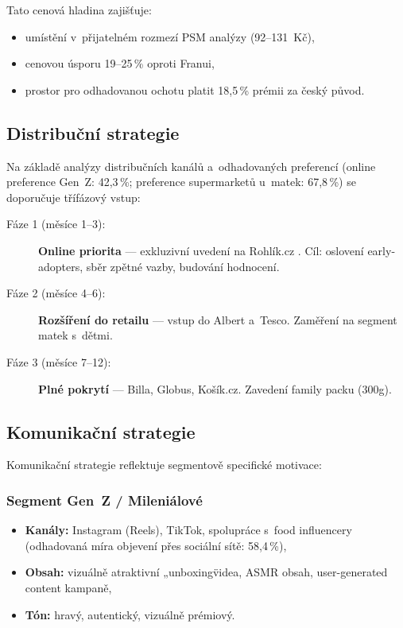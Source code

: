 Tato cenová hladina zajišťuje:
\begin{itemize}
  \item umístění v~přijatelném rozmezí PSM analýzy (92--131~Kč),
  \item cenovou úsporu 19--25\,\% oproti Franui,
  \item prostor pro odhadovanou ochotu platit 18,5\,\% prémii za český původ.
\end{itemize}

\subsection{Distribuční strategie}

Na základě analýzy distribučních kanálů a~odhadovaných preferencí (online preference Gen~Z: 42,3\,\%; preference supermarketů u~matek: 67,8\,\%) se doporučuje třífázový vstup:

\begin{description}
  \item[Fáze 1 (měsíce 1--3):] \textbf{Online priorita} — exkluzivní uvedení na Rohlík.cz \parencite{rohlik_franui_2026}. Cíl: oslovení early-adopters, sběr zpětné vazby, budování hodnocení.
  \item[Fáze 2 (měsíce 4--6):] \textbf{Rozšíření do retailu} — vstup do Albert a~Tesco. Zaměření na segment matek s~dětmi.
  \item[Fáze 3 (měsíce 7--12):] \textbf{Plné pokrytí} — Billa, Globus, Košík.cz. Zavedení family packu (300g).
\end{description}

\subsection{Komunikační strategie}

Komunikační strategie reflektuje segmentově specifické motivace:

\subsubsection{Segment Gen~Z / Mileniálové}

\begin{itemize}
  \item \textbf{Kanály:} Instagram (Reels), TikTok, spolupráce s~food influencery (odhadovaná míra objevení přes sociální sítě: 58,4\,\%),
  \item \textbf{Obsah:} vizuálně atraktivní „unboxing\" videa, ASMR obsah, user-generated content kampaně,
  \item \textbf{Tón:} hravý, autentický, vizuálně prémiový.
\end{itemize}

